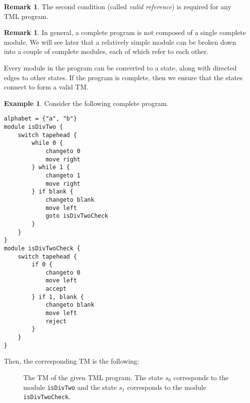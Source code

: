\documentclass{article}
\theoremstyle{definition}
\newtheorem{remark}[rules]{Remark}
\newtheorem{example}[rules]{Example}
\theoremstyle{plain}
\begin{document}
\begin{remark}
    The second condition (called \emph{valid reference}) is required for any TML program.
\end{remark}

\begin{remark}
    In general, a complete program is not composed of a single complete module. We will see later that a relatively simple module can be broken down into a couple of complete modules, each of which refer to each other.
\end{remark}

Every module in the program can be converted to a state, along with directed edges to other states. If the program is complete, then we ensure that the states connect to form a valid TM.

\begin{example}
    Consider the following complete program.
\begin{lstlisting}[language=TML]
alphabet = {"a", "b"}
module isDivTwo {
    switch tapehead {
        while 0 {
            changeto 0
            move right
        } while 1 {
            changeto 1
            move right
        } if blank {
            changeto blank
            move left
            goto isDivTwoCheck
        }
    }
}
module isDivTwoCheck {
    switch tapehead {
        if 0 {
            changeto 0
            move left
            accept
        } if 1, blank {
            changeto blank
            move left
            reject
        }
    }
}
\end{lstlisting}
Then, the corresponding TM is the following:
\begin{figure}[H]
    \centering
    \caption{The TM of the given TML program. The state $s_0$ corresponds to the module \texttt{isDivTwo} and the state $s_1$ corresponds to the module \texttt{isDivTwoCheck}.}
\end{figure}
\end{example}
\end{document}
